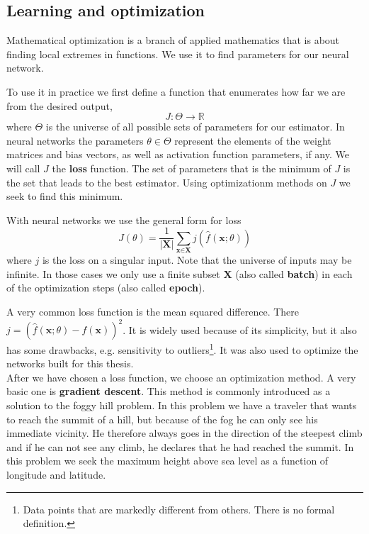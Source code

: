 \subsection{Learning and optimization}
\label{section:learning+opt}
Mathematical optimization is a branch of applied mathematics that is about finding local extremes in functions. We use it to find parameters for our neural network.

To use it in practice we first define a function that enumerates how far we are from the desired output, $$J:\Theta\rightarrow\mathbb{R}$$ where $\Theta$ is the universe of all possible sets of parameters for our estimator. In neural networks the parameters $\theta\in\Theta$ represent the elements of the weight matrices and bias vectors, as well as activation function parameters, if any. We will call $J$ the \textbf{loss} function. The set of parameters that is the minimum of $J$ is the set that leads to the best estimator. Using optimizationm methods on $J$ we seek to find this minimum. 

With neural networks we use the general form for loss $$J(\theta) = \frac{1}{|\textbf{X}|} \sum_{\textbf{x}\in \textbf{X}}j(\widehat{f}(\textbf{x};\theta))$$ where $j$ is the loss on a singular input.  Note that the universe of inputs may be infinite. In those cases we only use a finite subset $\textbf{X}$ (also called \textbf{batch}) in each of the optimization steps (also called \textbf{epoch}). 

A very common loss function is the mean squared difference. There $j=(\widehat{f}(\textbf{x};\theta)-f(\textbf{x}))^2$. It is widely used because of its simplicity, but it also has some drawbacks, e.g. sensitivity to outliers\footnote{Data points that are markedly different from others. There is no formal definition.}. It was also used to optimize the networks built for this thesis.\\

After we have chosen a loss function, we choose an optimization method. A very basic one is \textbf{gradient descent}. This method is commonly introduced as a solution to the foggy hill problem. In this problem we have a traveler that wants to reach the summit of a hill, but because of the fog he can only see his immediate vicinity. He therefore always goes in the direction of the steepest climb and if he can not see any climb, he declares that he had reached the summit. In this problem we seek the maximum height above sea level as a function of longitude and latitude.

